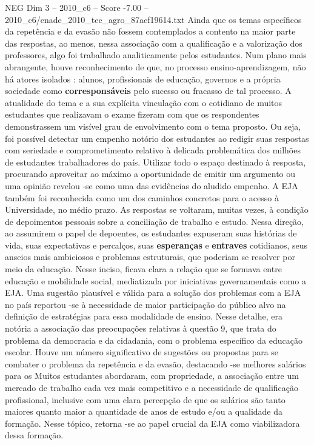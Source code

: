 \begin{textsample}{NEG Dim 3 – 2010\_c6 – Score -7.00 – 2010\_c6/enade\_2010\_tec\_agro\_87acf19614.txt}
Ainda que os temas específicos da repetência e da evasão não fossem contemplados a contento na maior parte das respostas, ao menos, nessa associação com a qualificação e a valorização dos professores, algo foi trabalhado analiticamente pelos estudantes.
Num plano mais abrangente, houve reconhecimento de que, no processo ensino-aprendizagem, não há atores isolados : alunos, profissionais de educação, governos e a própria sociedade como \textbf{corresponsáveis} pelo sucesso ou fracasso de tal processo.
A atualidade do tema e a sua explícita vinculação com o cotidiano de muitos estudantes que realizavam o exame fizeram com que os respondentes demonstrassem um visível grau de envolvimento com o tema proposto.
Ou seja, foi possível detectar um empenho notório dos estudantes ao redigir suas respostas com seriedade e comprometimento relativo à delicada problemática dos milhões de estudantes trabalhadores do país.
Utilizar todo o espaço destinado à resposta, procurando aproveitar ao máximo a oportunidade de emitir um argumento ou uma opinião revelou -se como uma das evidências do aludido empenho.
A EJA também foi reconhecida como um dos caminhos concretos para o acesso à Universidade, no médio prazo.
As respostas se voltaram, muitas vezes, à condição de depoimentos pessoais sobre a conciliação de trabalho e estudo.
Nessa direção, ao assumirem o papel de depoentes, os estudantes expuseram suas histórias de vida, suas expectativas e percalços, suas \textbf{esperanças} e \textbf{entraves} cotidianos, seus anseios mais ambiciosos e problemas estruturais, que poderiam se resolver por meio da educação.
Nesse inciso, ficava clara a relação que se formava entre educação e mobilidade social, mediatizada por iniciativas governamentais como a EJA.
Uma sugestão plausível e válida para a solução dos problemas com a EJA no país reportou -se à necessidade de maior participação do público alvo na definição de estratégias para essa modalidade de ensino.
Nesse detalhe, era notória a associação das preocupações relativas à questão 9, que trata do problema da democracia e da cidadania, com o problema específico da educação escolar.
Houve um número significativo de sugestões ou propostas para se combater o problema da repetência e da evasão, destacando -se melhores salários para os Muitos estudantes abordaram, com propriedade, a associação entre um mercado de trabalho cada vez mais competitivo e a necessidade de qualificação profissional, inclusive com uma clara percepção de que os salários são tanto maiores quanto maior a quantidade de anos de estudo e/ou a qualidade da formação.
Nesse tópico, retorna -se ao papel crucial da EJA como viabilizadora dessa formação.

\end{textsample}
